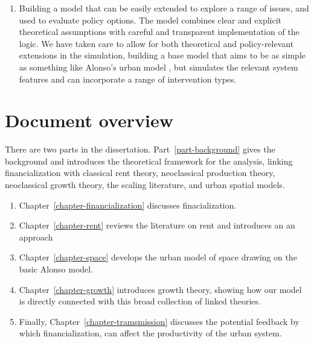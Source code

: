 \begin{enumerate}

    \item Building a model that can be easily extended to explore a range of issues, and used to evaluate policy options. The model combines clear and explicit theoretical assumptions with careful and transparent implementation of the logic. We have taken care to allow for both theoretical and policy-relevant extensions in the simulation,  building a base model that aims to be as simple as something like Alonso's urban model \cite{alonsoLocationLandUse1964}, but simulates the relevant system features and can incorporate a range of intervention types. 
\end{enumerate}


\section{Document overview}
There are two parts in the dissertation. Part~\ref{part-background} gives the background and introduces the theoretical framework for the analysis, linking financialization with classical rent theory, neoclassical production theory, neoclassical growth theory, the scaling literature, and urban spatial models. 

\begin{enumerate}
    \item Chapter~\ref{chapter-financialization} discusses finacialization.

    \item Chapter~\ref{chapter-rent} reviews the literature on rent and introduces an an approach %

    \item Chapter~\ref{chapter-space} develops the urban model of space drawing on the basic Alonso model.

    \item Chapter~\ref{chapter-growth} introduces growth theory, showing how our model is directly connected with this broad collection of linked theories. 

    \item Finally, Chapter~\ref{chapter-tramsmission} discusses the potential feedback by which financialization, can affect the productivity of the urban system. %
\end{enumerate}
 
